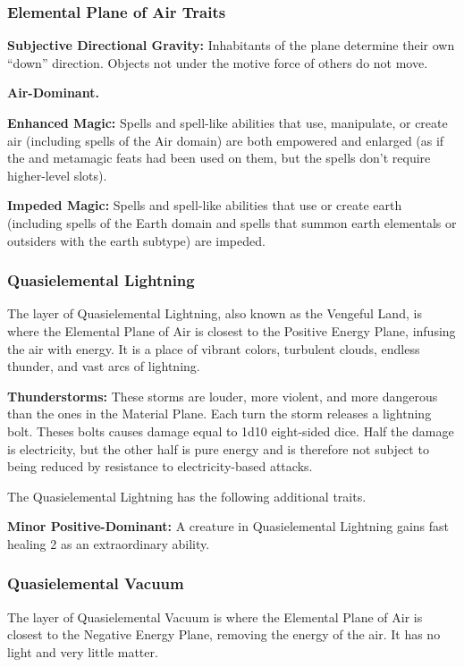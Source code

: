 \subsubsection{Elemental Plane of Air Traits}
\begin{itemize*}
\item \textbf{Subjective Directional Gravity:} Inhabitants of the plane determine their own ``down'' direction. Objects not under the motive force of others do not move.
\item \textbf{Air-Dominant.}
\item \textbf{Enhanced Magic:} Spells and spell-like abilities that use, manipulate, or create air (including spells of the Air domain) are both empowered and enlarged (as if the  and  metamagic feats had been used on them, but the spells don't require higher-level slots).
\item \textbf{Impeded Magic:} Spells and spell-like abilities that use or create earth (including spells of the Earth domain and spells that summon earth elementals or outsiders with the earth subtype) are impeded.
\end{itemize*}

\subsubsection{Quasielemental Lightning}
The layer of Quasielemental Lightning, also known as the Vengeful Land, is where the Elemental Plane of Air is closest to the Positive Energy Plane, infusing the air with energy. It is a place of vibrant colors, turbulent clouds, endless thunder, and vast arcs of lightning.

\textbf{Thunderstorms:} These storms are louder, more violent, and more dangerous than the ones in the Material Plane. Each turn the storm releases a lightning bolt. Theses bolts causes damage equal to 1d10 eight-sided dice. Half the damage is electricity, but the other half is pure energy and is therefore not subject to being reduced by resistance to electricity-based attacks.

The Quasielemental Lightning has the following additional traits.
\begin{itemize*}
\item \textbf{Minor Positive-Dominant:} A creature in Quasielemental Lightning gains fast healing 2 as an extraordinary ability.
\end{itemize*}

\subsubsection{Quasielemental Vacuum}
The layer of Quasielemental Vacuum is where the Elemental Plane of Air is closest to the Negative Energy Plane, removing the energy of the air. It has no light and very little matter.

